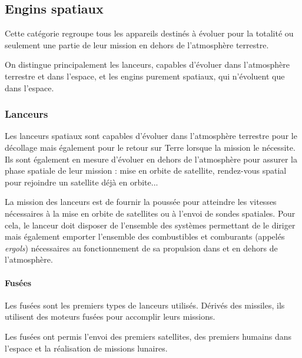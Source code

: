 \begin{center}
\begin{minipage}[c]{1.0\linewidth}
\begin{figure}[H]
\begin{minipage}[c]{0.5\linewidth}
	\end{minipage}
	\end{figure}
	\end{minipage}
	\end{center}
	
	
\subsection{Engins spatiaux}
	Cette catégorie regroupe tous les appareils destinés à évoluer pour la totalité ou seulement une partie de leur mission en dehors de l'atmosphère terrestre.
	
	On distingue principalement les lanceurs, capables d'évoluer dans l'atmosphère terrestre et dans l'espace, et les engins purement spatiaux, qui n'évoluent que dans l'espace.

	\subsubsection{Lanceurs}
	Les lanceurs spatiaux sont capables d'évoluer dans l'atmosphère terrestre pour le décollage mais également pour le retour sur Terre lorsque la mission le nécessite. Ils sont également en mesure d'évoluer en dehors de l'atmosphère pour assurer la phase spatiale de leur mission : mise en orbite de satellite, rendez-vous spatial pour rejoindre un satellite déjà en orbite...
	
	La mission des lanceurs est de fournir la poussée pour atteindre les vitesses nécessaires à la mise en orbite de satellites ou à l'envoi de sondes spatiales. Pour cela, le lanceur doit disposer de l'ensemble des systèmes permettant de le diriger mais également emporter l'ensemble des combustibles et comburants (appelés \textit{ergols}) nécessaires au fonctionnement de sa propulsion dans et en dehors de l'atmosphère.
	
		\paragraph{Fusées}
		Les fusées  sont les premiers types de lanceurs utilisés. Dérivés des missiles, ils utilisent des moteurs fusées pour accomplir leurs missions.
		
		Les fusées ont permis l'envoi des premiers satellites, des premiers humains dans l'espace et la réalisation de missions lunaires.
		
